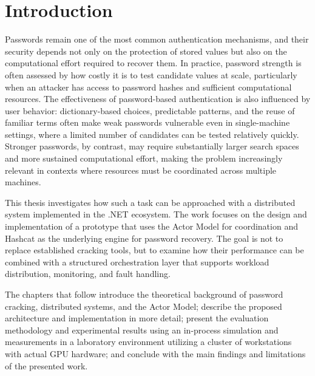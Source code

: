 \chapter{Introduction}
\label{chap:intro}

Passwords remain one of the most common authentication mechanisms, and their security depends not only on the protection of stored values but also on the computational effort required to recover them. In practice, password strength is often assessed by how costly it is to test candidate values at scale, particularly when an attacker has access to password hashes and sufficient computational resources. The effectiveness of password-based authentication is also influenced by user behavior: dictionary-based choices, predictable patterns, and the reuse of familiar terms often make weak passwords vulnerable even in single-machine settings, where a limited number of candidates can be tested relatively quickly. Stronger passwords, by contrast, may require substantially larger search spaces and more sustained computational effort, making the problem increasingly relevant in contexts where resources must be coordinated across multiple machines.

This thesis investigates how such a task can be approached with a distributed system implemented in the .NET ecosystem. The work focuses on the design and implementation of a prototype that uses the Actor Model for coordination and Hashcat as the underlying engine for password recovery. The goal is not to replace established cracking tools, but to examine how their performance can be combined with a structured orchestration layer that supports workload distribution, monitoring, and fault handling.

The chapters that follow introduce the theoretical background of password cracking, distributed systems, and the Actor Model; describe the proposed architecture and implementation in more detail; present the evaluation methodology and experimental results using an in-process simulation and measurements in a laboratory environment utilizing a cluster of workstations with actual GPU hardware; and conclude with the main findings and limitations of the presented work.



